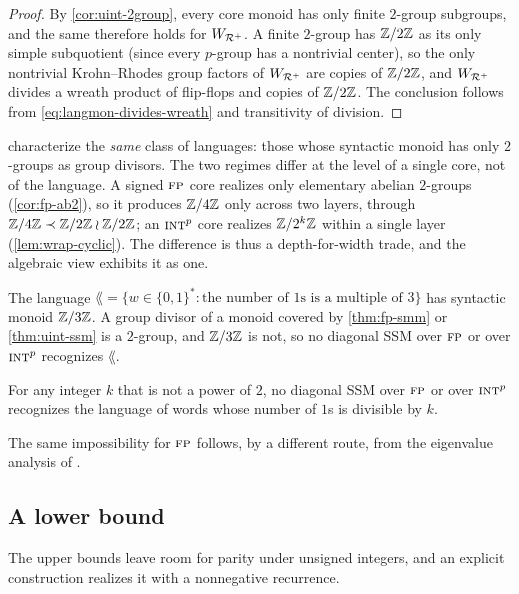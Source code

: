 \documentclass{article}
\begin{document}
\begin{proof}
By \cref{cor:uint-2group}, every core monoid has only finite $2$-group subgroups, and the same therefore holds for $W_{{\mathcal{R}^{+}}}$.
A finite $2$-group has $\mathbb{Z}/{2}\mathbb{Z}$ as its only simple subquotient (since every $p$-group has a nontrivial center), so the only nontrivial Krohn--Rhodes group factors of $W_{{\mathcal{R}^{+}}}$ are copies of $\mathbb{Z}/{2}\mathbb{Z}$, and $W_{{\mathcal{R}^{+}}}$ divides a wreath product of flip-flops and copies of $\mathbb{Z}/{2}\mathbb{Z}$.
The conclusion follows from \cref{eq:langmon-divides-wreath} and transitivity of division.
\end{proof}

\begin{remark}\label{rem:depth-width}
 characterize the \emph{same} class of languages: those whose syntactic monoid has only $2$-groups as group divisors.
The two regimes differ at the level of a single core, not of the language.
A signed $\textsc{fp}$ core realizes only elementary abelian $2$-groups (\cref{cor:fp-ab2}), so it produces $\mathbb{Z}/{4}\mathbb{Z}$ only across two layers, through $\mathbb{Z}/{4}\mathbb{Z} \prec \mathbb{Z}/{2}\mathbb{Z} \wr \mathbb{Z}/{2}\mathbb{Z}$; an $\textsc{int}^p$ core realizes $\mathbb{Z}/{2^k}\mathbb{Z}$ within a single layer (\cref{lem:wrap-cyclic}).
The difference is thus a depth-for-width trade, and the algebraic view exhibits it as one.
\end{remark}

\begin{example}\label{ex:mod3}
The language $\lang = \{ w \in \{0,1\}^* : \text{the number of } 1\text{s is a multiple of } 3 \}$ has syntactic monoid $\mathbb{Z}/{3}\mathbb{Z}$.
A group divisor of a monoid covered by \cref{thm:fp-smm} or \cref{thm:uint-ssm} is a $2$-group, and $\mathbb{Z}/{3}\mathbb{Z}$ is not, so no diagonal SSM over $\textsc{fp}$ or over $\textsc{int}^p$ recognizes $\lang$.
\end{example}

\begin{corollary}\label{cor:mod-k}
For any integer $k$ that is not a power of $2$, no diagonal SSM over $\textsc{fp}$ or over $\textsc{int}^p$ recognizes the language of words whose number of $1$s is divisible by $k$.
\end{corollary}

The same impossibility for $\textsc{fp}$ follows, by a different route, from the eigenvalue analysis of \citet[Theorem 2]{grazzi2025unlocking}.


\subsection{A lower bound}\label{sec:ssm-lower}
The upper bounds leave room for parity under unsigned integers, and an explicit construction realizes it with a nonnegative recurrence.
\end{document}
